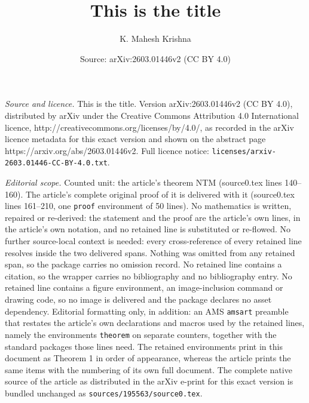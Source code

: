 \documentclass[10pt,a4paper]{amsart}
\title{This is the title}
\author{K. Mahesh Krishna}
\date{Source: arXiv:2603.01446v2 (CC BY 4.0)}
\begin{document}
\maketitle

\noindent\emph{Source and licence.} This is the title. Version arXiv:2603.01446v2 (CC BY 4.0), distributed by arXiv under the Creative Commons Attribution 4.0 International licence, http://creativecommons.org/licenses/by/4.0/, as recorded in the arXiv licence metadata for this exact version and shown on the abstract page https://arxiv.org/abs/2603.01446v2. Full licence notice: \texttt{licenses/arxiv-2603.01446-CC-BY-4.0.txt}.\par\smallskip

\noindent\textit{Editorial scope.} Counted unit: the article's theorem NTM (source0.tex lines 140--160). The article's complete original proof of it is delivered with it (source0.tex lines 161--210, one \texttt{proof} environment of 50 lines). No mathematics is written, repaired or re-derived: the statement and the proof are the article's own lines, in the article's own notation, and no retained line is substituted or re-flowed.  No further source-local context is needed: every cross-reference of every retained line resolves inside the two delivered spans.  Nothing was omitted from any retained span, so the package carries no omission record.  No retained line contains a citation, so the wrapper carries no bibliography and no bibliography entry.  No retained line contains a figure environment, an image-inclusion command or drawing code, so no image is delivered and the package declares no asset dependency.  Editorial formatting only, in addition: an AMS \texttt{amsart} preamble that restates the article's own declarations and macros used by the retained lines, namely the environments \texttt{theorem} on separate counters, together with the standard packages those lines need.  The retained environments print in this document as Theorem 1 in order of appearance, whereas the article prints the same items with the numbering of its own full document.  The complete native source of the article as distributed in the arXiv e-print for this exact version is bundled unchanged as \texttt{sources/195563/source0.tex}.
\end{document}
